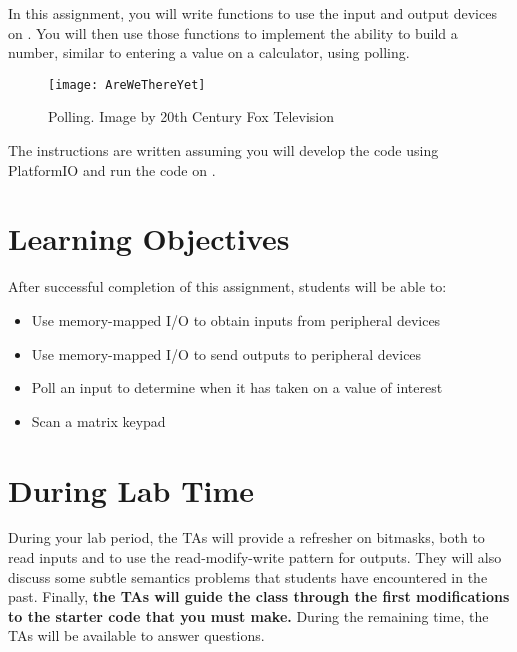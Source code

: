 In this assignment, you will write functions to use the input and output devices on \runtimeenvironment.
You will then use those functions to implement the ability to build a number, similar to entering a value on a calculator, using polling.

\begin{figure}[h]
    \centering
    \texttt{[image: AreWeThereYet]}
    \caption{Polling. \tiny Image by 20th Century Fox Television}
\end{figure}

The instructions are written assuming you will develop the code using PlatformIO    %
and run the code on \runtimeenvironment.

\tableofcontents

\section*{Learning Objectives}

After successful completion of this assignment, students will be able to:
\begin{itemize}
    \item Use memory-mapped I/O to obtain inputs from peripheral devices
    \item Use memory-mapped I/O to send outputs to peripheral devices
    \item Poll an input to determine when it has taken on a value of interest
    \item Scan a matrix keypad
\end{itemize}

\section*{During Lab Time}

During your lab period, the TAs will provide a refresher on bitmasks, both to read inputs and to use the read-modify-write pattern for outputs.
They will also discuss some subtle semantics problems that students have encountered in the past.
Finally, \textbf{the TAs will guide the class through the first modifications to the starter code that you must make.}
During the remaining time, the TAs will be available to answer questions.

%
